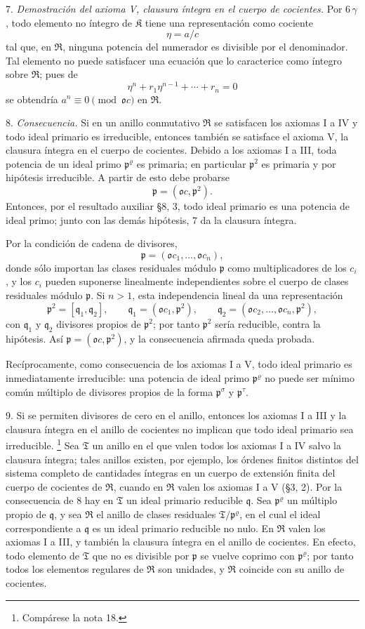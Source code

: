 \documentclass[11pt]{article}
\providecommand{\mR}{\mathfrak{R}}
\providecommand{\mK}{\mathfrak{K}}
\providecommand{\mT}{\mathfrak{T}}
\providecommand{\mo}{\mathfrak{o}}
\providecommand{\mpideal}{\mathfrak{p}}
\providecommand{\mq}{\mathfrak{q}}
\begin{document}
7. \emph{Demostración del axioma V, clausura íntegra en el cuerpo de cocientes.} Por 6\,$\gamma$, todo elemento no íntegro de $\mK$ tiene una representación como cociente
\[
        \eta=a/c
\]
tal que, en $\mR$, ninguna potencia del numerador es divisible por el denominador. Tal elemento no puede satisfacer una ecuación que lo caracterice como íntegro sobre $\mR$; pues de
\[
        \eta^n+r_1\eta^{n-1}+\cdots+r_n=0
\]
se obtendría $a^n\equiv0\pmod{\mo c}$ en $\mR$.

8. \emph{Consecuencia.} Si en un anillo conmutativo $\mR$ se satisfacen los axiomas I a IV y todo ideal primario es irreducible, entonces también se satisface el axioma V, la clausura íntegra en el cuerpo de cocientes. Debido a los axiomas I a III, toda potencia de un ideal primo $\mpideal^\varrho$ es primaria; en particular $\mpideal^2$ es primaria y por hipótesis irreducible. A partir de esto debe probarse
\[
        \mpideal=(\mo c,\mpideal^2).
\]
Entonces, por el resultado auxiliar §8, 3, todo ideal primario es una potencia de ideal primo; junto con las demás hipótesis, 7 da la clausura íntegra.

Por la condición de cadena de divisores,
\[
        \mpideal=(\mo c_1,\ldots,\mo c_n),
\]
donde sólo importan las clases residuales módulo $\mpideal$ como multiplicadores de los $c_i$, y los $c_i$ pueden suponerse linealmente independientes sobre el cuerpo de clases residuales módulo $\mpideal$. Si $n>1$, esta independencia lineal da una representación
\[
        \mpideal^2=[\mq_1,\mq_2],
        \qquad
        \mq_1=(\mo c_1,\mpideal^2),
        \qquad
        \mq_2=(\mo c_2,\ldots,\mo c_n,\mpideal^2),
\]
con $\mq_1$ y $\mq_2$ divisores propios de $\mpideal^2$; por tanto $\mpideal^2$ sería reducible, contra la hipótesis. Así $\mpideal=(\mo c,\mpideal^2)$, y la consecuencia afirmada queda probada.

Recíprocamente, como consecuencia de los axiomas I a V, todo ideal primario es inmediatamente irreducible: una potencia de ideal primo $\mpideal^\varrho$ no puede ser mínimo común múltiplo de divisores propios de la forma $\mpideal^\sigma$ y $\mpideal^\tau$.

9. Si se permiten divisores de cero en el anillo, entonces los axiomas I a III y la clausura íntegra en el anillo de cocientes no implican que todo ideal primario sea irreducible.
\footnote{Compárese la nota 18.}
Sea $\mT$ un anillo en el que valen todos los axiomas I a IV salvo la clausura íntegra; tales anillos existen, por ejemplo, los órdenes finitos distintos del sistema completo de cantidades íntegras en un cuerpo de extensión finita del cuerpo de cocientes de $\mR$, cuando en $\mR$ valen los axiomas I a V (§3, 2). Por la consecuencia de 8 hay en $\mT$ un ideal primario reducible $\mq$. Sea $\mpideal^\varrho$ un múltiplo propio de $\mq$, y sea $\mR$ el anillo de clases residuales $\mT/\mpideal^\varrho$, en el cual el ideal correspondiente a $\mq$ es un ideal primario reducible no nulo. En $\mR$ valen los axiomas I a III, y también la clausura íntegra en el anillo de cocientes. En efecto, todo elemento de $\mT$ que no es divisible por $\mpideal$ se vuelve coprimo con $\mpideal^\varrho$; por tanto todos los elementos regulares de $\mR$ son unidades, y $\mR$ coincide con su anillo de cocientes.
\end{document}
